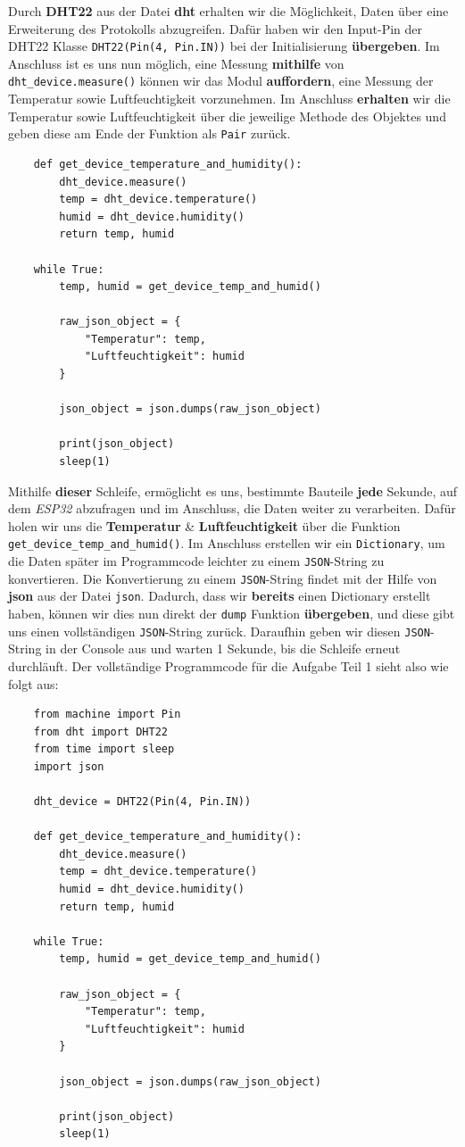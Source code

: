 \documentclass[9pt,a4paper]{report}
\begin{document}
	Durch \textbf{DHT22} aus der Datei \textbf{dht} erhalten wir die Möglichkeit, Daten über eine Erweiterung des Protokolls abzugreifen. Dafür haben wir den Input-Pin der DHT22 Klasse \texttt{DHT22(Pin(4, Pin.IN))} bei der Initialisierung \textbf{übergeben}. Im Anschluss ist es uns nun möglich, eine Messung \textbf{mithilfe} von \texttt{dht\_device.measure()} können wir das Modul \textbf{auffordern}, eine Messung der Temperatur sowie Luftfeuchtigkeit vorzunehmen. Im Anschluss \textbf{erhalten} wir die Temperatur sowie Luftfeuchtigkeit über die jeweilige Methode des Objektes und geben diese am Ende der Funktion als \texttt{Pair} zurück.
	\newline
	\begin{lstlisting}
	def get_device_temperature_and_humidity():
		dht_device.measure()
		temp = dht_device.temperature()
		humid = dht_device.humidity()
		return temp, humid
		
	while True:
		temp, humid = get_device_temp_and_humid()
	
		raw_json_object = {
			"Temperatur": temp,
			"Luftfeuchtigkeit": humid
		}
	
		json_object = json.dumps(raw_json_object)
	
		print(json_object)
		sleep(1)
	\end{lstlisting}
	\vfill
	Mithilfe \textbf{dieser} Schleife, ermöglicht es uns, bestimmte Bauteile \textbf{jede} Sekunde, auf dem \textit{ESP32} abzufragen und im Anschluss, die Daten weiter zu verarbeiten.
	Dafür holen wir uns die \textbf{Temperatur} \& \textbf{Luftfeuchtigkeit} über die Funktion \texttt{get\_device\_temp\_and\_humid()}.
	Im Anschluss erstellen wir ein \texttt{Dictionary}, um die Daten später im Programmcode leichter zu einem \texttt{JSON}-String zu konvertieren.
	Die Konvertierung zu einem \texttt{JSON}-String findet mit der Hilfe von \textbf{json} aus der Datei \texttt{json}. Dadurch, dass wir \textbf{bereits} einen Dictionary erstellt haben, können wir dies nun direkt der \texttt{dump} Funktion \textbf{übergeben}, und diese gibt uns einen vollständigen \texttt{JSON}-String zurück.
	Daraufhin geben wir diesen \texttt{JSON}-String in der Console aus und warten 1 Sekunde, bis die Schleife erneut durchläuft.
	\newpage
	Der vollständige Programmcode für die Aufgabe Teil 1 sieht also wie folgt aus:
	\begin{lstlisting}
	from machine import Pin
	from dht import DHT22
	from time import sleep
	import json
	
	dht_device = DHT22(Pin(4, Pin.IN))
	
	def get_device_temperature_and_humidity():
		dht_device.measure()
		temp = dht_device.temperature()
		humid = dht_device.humidity()
		return temp, humid

	while True:
		temp, humid = get_device_temp_and_humid()

		raw_json_object = {
			"Temperatur": temp,
			"Luftfeuchtigkeit": humid
		}

		json_object = json.dumps(raw_json_object)

		print(json_object)
		sleep(1)
	\end{lstlisting}
	
\end{document}

